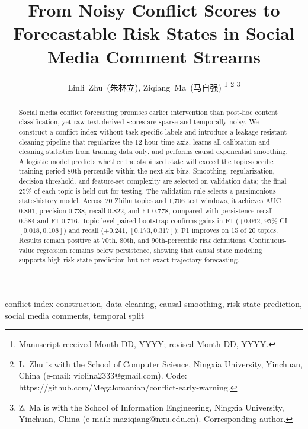 \documentclass[journal]{IEEEtran}
\begin{document}
\title{From Noisy Conflict Scores to Forecastable Risk States in Social Media Comment Streams}

\author{Linli~Zhu\ (朱林立), Ziqiang~Ma\ (马自强)%
\thanks{Manuscript received Month DD, YYYY; revised Month DD, YYYY.}%
\thanks{L. Zhu is with the School of Computer Science, Ningxia University, Yinchuan, China (e-mail: violina2333@gmail.com). Code: https://github.com/Megalomanian/conflict-early-warning.}%
\thanks{Z. Ma is with the School of Information Engineering, Ningxia University, Yinchuan, China (e-mail: maziqiang@nxu.edu.cn). Corresponding author.}}

\maketitle

\begin{abstract}
Social media conflict forecasting promises earlier intervention than post-hoc content classification, yet raw text-derived scores are sparse and temporally noisy. We construct a conflict index without task-specific labels and introduce a leakage-resistant cleaning pipeline that regularizes the 12-hour time axis, learns all calibration and cleaning statistics from training data only, and performs causal exponential smoothing. A logistic model predicts whether the stabilized state will exceed the topic-specific training-period 80th percentile within the next six bins. Smoothing, regularization, decision threshold, and feature-set complexity are selected on validation data; the final 25\% of each topic is held out for testing. The validation rule selects a parsimonious state-history model. Across 20 Zhihu topics and 1,706 test windows, it achieves AUC $0.891$, precision $0.738$, recall $0.822$, and F1 $0.778$, compared with persistence recall $0.584$ and F1 $0.716$. Topic-level paired bootstrap confirms gains in F1 ($+0.062$, 95\% CI $[0.018,0.108]$) and recall ($+0.241$, $[0.173,0.317]$); F1 improves on 15 of 20 topics. Results remain positive at 70th, 80th, and 90th-percentile risk definitions. Continuous-value regression remains below persistence, showing that causal state modeling supports high-risk-state prediction but not exact trajectory forecasting.
\end{abstract}

\begin{IEEEkeywords}
conflict-index construction, data cleaning, causal smoothing, risk-state prediction, social media comments, temporal split
\end{IEEEkeywords}
\end{document}
